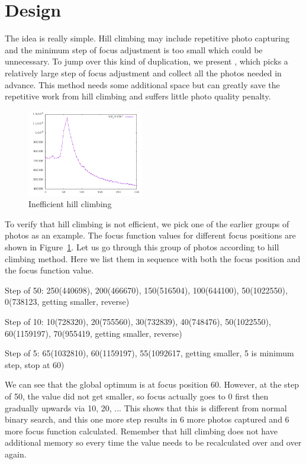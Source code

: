 \section{Design}

The idea is really simple.
Hill climbing may include repetitive photo capturing and the minimum step of focus adjustment is too small which could be unnecessary.
To jump over this kind of duplication, we present \sysname, which picks a relatively large step of focus adjustment and collect all the photos needed in advance.
This method needs some additional space but can greatly save the repetitive work from hill climbing and suffers little photo quality penalty.

\begin{figure}[tb!]
	\begin{center}
		\includegraphics[width=2in]{midplot}
	\end{center}
	\caption{Inefficient hill climbing}
	\label{f:midplot}
\end{figure}

To verify that hill climbing is not efficient, we pick one of the earlier groups of photos as an example.
The focus function values for different focus positions are shown in Figure~\ref{f:midplot}.
Let us go through this group of photos according to hill climbing method.
Here we list them in sequence with both the focus position and the focus function value.

Step of 50: 250(440698), 200(466670), 150(516504), 100(644100), 50(1022550), 0(738123, getting smaller, reverse)

Step of 10: 10(728320), 20(755560), 30(732839), 40(748476), 50(1022550), 60(1159197), 70(955419, getting smaller, reverse)

Step of 5: 65(1032810), 60(1159197), 55(1092617, getting smaller, 5 is minimum step, stop at 60)

We can see that the global optimum is at focus position 60.
However, at the step of 50, the value did not get smaller, so focus actually goes to 0 first then gradually upwards via 10, 20, ...
This shows that this is different from normal binary search, and this one more step results in 6 more photos captured and 6 more focus function calculated.
Remember that hill climbing does not have additional memory so every time the value needs to be recalculated over and over again.


